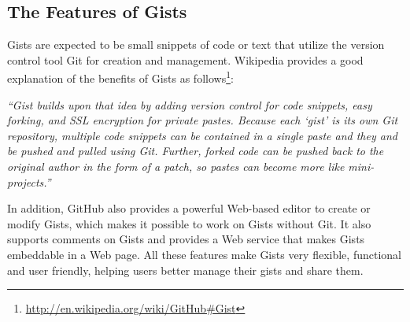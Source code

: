 \subsection{The Features of Gists}

Gists are expected to be small snippets of code or text that utilize the version control tool Git for creation and management. Wikipedia provides a good explanation of the benefits of Gists as follows\footnote{\url{http://en.wikipedia.org/wiki/GitHub\#Gist}}: 

\textsl{``Gist builds upon that idea by adding version control for code snippets, easy forking, and SSL encryption for private pastes. Because each `gist' is its own Git repository, multiple code snippets can be contained in a single paste and they and be pushed and pulled using Git. Further, forked code can be pushed back to the original author in the form of a patch, so pastes can become more like mini-projects.''}

In addition, GitHub also provides a powerful Web-based editor to create or modify Gists, which makes it possible to work on Gists without Git. It also supports comments on Gists and provides a Web service that makes Gists embeddable in a Web page. All these features make Gists very flexible, functional and user friendly, helping users better manage their gists and share them.